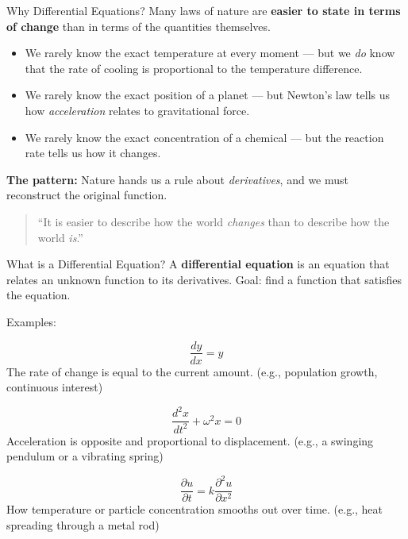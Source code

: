 
\begin{frame}{Why Differential Equations?}
Many laws of nature are \textbf{easier to state in terms of change} than in terms of the quantities themselves.

\vspace{0.4cm}

\begin{itemize}
    \item We rarely know the exact temperature at every moment --- but we \emph{do} know that the rate of cooling is proportional to the temperature difference.
    \item We rarely know the exact position of a planet --- but Newton's law tells us how \emph{acceleration} relates to gravitational force.
    \item We rarely know the exact concentration of a chemical --- but the reaction rate tells us how it changes.
\end{itemize}

\vspace{0.4cm}

\textbf{The pattern:} Nature hands us a rule about \emph{derivatives}, and we must reconstruct the original function.

\vspace{0.3cm}

\begin{quote}
``It is easier to describe how the world \emph{changes} than to describe how the world \emph{is}.''
\end{quote}
\end{frame}


\begin{frame}{What is a Differential Equation?}
A \textbf{differential equation} is an equation that relates an unknown function to its derivatives. Goal: find a function that satisfies the equation.

Examples:

\[
\frac{dy}{dx} = y
\]
The rate of change is equal to the current amount. (e.g., population growth, continuous interest)

\[
\frac{d^2x}{dt^2} + \omega^2 x = 0
\]
Acceleration is opposite and proportional to displacement. (e.g., a swinging pendulum or a vibrating spring)

\[
\frac{\partial u}{\partial t} = k \frac{\partial^2 u}{\partial x^2}
\]
How temperature or particle concentration smooths out over time. (e.g., heat spreading through a metal rod)
\end{frame}



